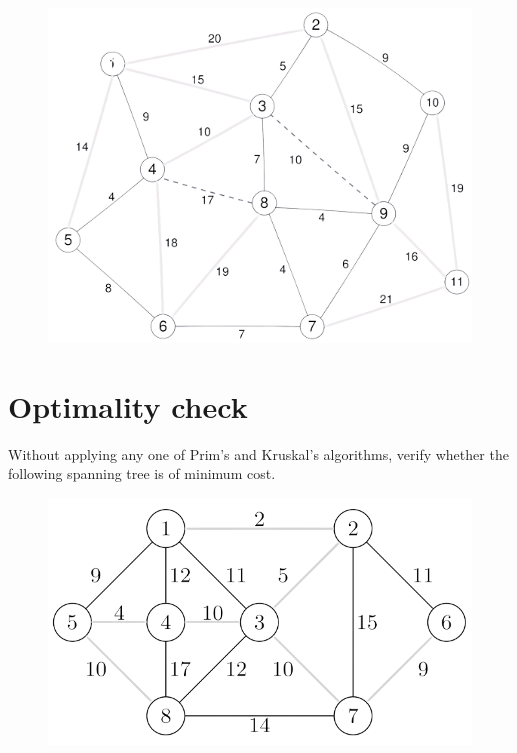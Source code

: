 \documentclass[12pt, a4paper]{report}
\begin{document}
\begin{enumerate}
\begin{figure}[H]
                    \includegraphics[width=0.75\linewidth]{images/kruskal.png}
                \end{figure}
        \end{enumerate}

    \newpage

    \section{Optimality check}
        Without applying any one of Prim's and Kruskal's algorithms, verify whether the following spanning tree is of minimum cost. 
        \begin{figure}[H]
            \centering
            \includegraphics[width=0.5\linewidth]{images/optimality.png}
        \end{figure}
\end{document}
